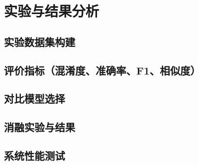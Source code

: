 \chapter{实验与结果分析}
\label{ch:experiments}

\section{实验数据集构建}
\label{sec:datasets}

\section{评价指标（混淆度、准确率、F1、相似度）}
\label{sec:metrics}

\section{对比模型选择}
\label{sec:baselines}

\section{消融实验与结果}
\label{sec:ablation}

\section{系统性能测试}
\label{sec:perf}

